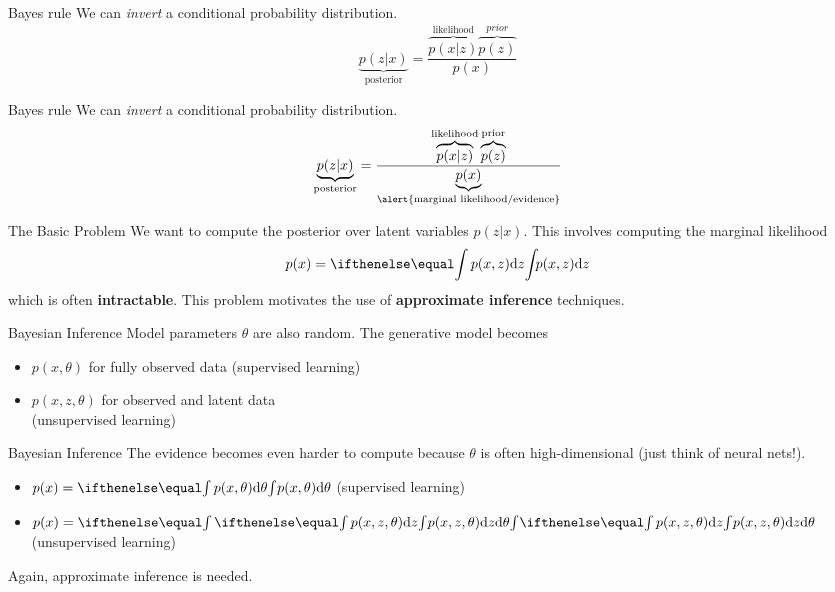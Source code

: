 \documentclass[14pt]{beamer}
\begin{document}
\begin{frame}{Bayes rule}
We can \textit{invert} a conditional probability distribution.
\begin{equation*}
\underbrace{p(z|x)}_{\text{posterior}} = \frac{\overbrace{p(x|z)}^{\text{likelihood}}\overbrace{p(z)}^{prior}}{p(x)}
\end{equation*}
\end{frame}

\begin{frame}{Bayes rule}
We can \textit{invert} a conditional probability distribution.
\begin{equation*}
\underbrace{p(z|x)}_{\text{posterior}} = \frac{\overbrace{p(x|z)}^{\text{likelihood}}\overbrace{p(z)}^{\text{prior}}}{\underbrace{p(x)}_{\text{\alert{marginal likelihood/evidence}}}}
\end{equation*}
\end{frame}

\begin{frame}{The Basic Problem}
We want to compute the posterior over latent variables $ p(z|x) $. This involves computing the marginal likelihood
$$ p(x) = \intl{ p(x,z) }{z} $$
which is often \textbf{intractable}. This problem motivates the use of \textbf{approximate inference} techniques.
\end{frame}

\begin{frame}{Bayesian Inference}
Model parameters $ \theta $ are also random. The generative model becomes
\begin{itemize}
\item $ p(x,\theta) $ for fully observed data (supervised learning)
\item $ p(x,z,\theta) $ for observed and latent data \\ (unsupervised learning)
\end{itemize}
\end{frame}

\begin{frame}{Bayesian Inference}
The evidence becomes even harder to compute because $ \theta $ is often high-dimensional
(just think of neural nets!).
\begin{itemize}
\item $ p(x) = \intl{ p(x, \theta)}{\theta} $ (supervised learning)
\item $ p(x) = \intl{ \intl{ p(x, z, \theta)} {z}}{\theta} $ (unsupervised learning)
\end{itemize}
\pause
Again, approximate inference is needed.
\end{frame}
\end{document}
